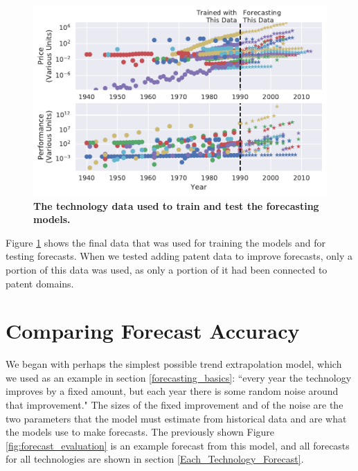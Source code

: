 \documentclass{article}
\begin{document}
\begin{figure}
    \centering
    \includegraphics[width=.75\textwidth]{figs/Data_to_Forecast.pdf}
    \caption{\textbf{The technology data used to train and test the forecasting models.}}
    \label{fig:Data_to_Forecast_Performance}
\end{figure}

Figure \ref{fig:Data_to_Forecast_Performance} shows the final data that was used for training the models and for testing forecasts. When we tested adding patent data to improve forecasts, only a portion of this data was used, as only a portion of it had been connected to patent domains.

\section{Comparing Forecast Accuracy}

We began with perhaps the simplest possible trend extrapolation model, which we used as an example in section \ref{forecasting_basics}: ``every year the technology improves by a fixed amount, but each year there is some random noise around that improvement." The sizes of the fixed improvement and of the noise are the two parameters that the model must estimate from historical data and are what the models use to make forecasts. The previously shown Figure \ref{fig:forecast_evaluation} is an example forecast from this model, and all forecasts for all technologies are shown in section \ref{Each_Technology_Forecast}. 
\end{document}
